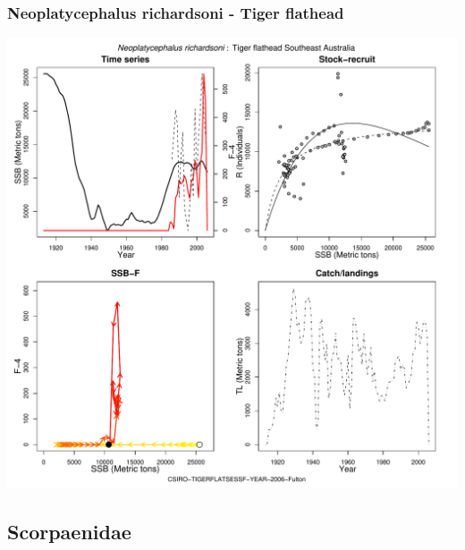 \subsubsection{Neoplatycephalus richardsoni - Tiger flathead}
\begin{center}
\includegraphics[width=1.2\textwidth]{../R/figures/CSIRO-TIGERFLATSESSF-YEAR-2006-Fulton.pdf}
\end{center}

\subsection{Scorpaenidae}

